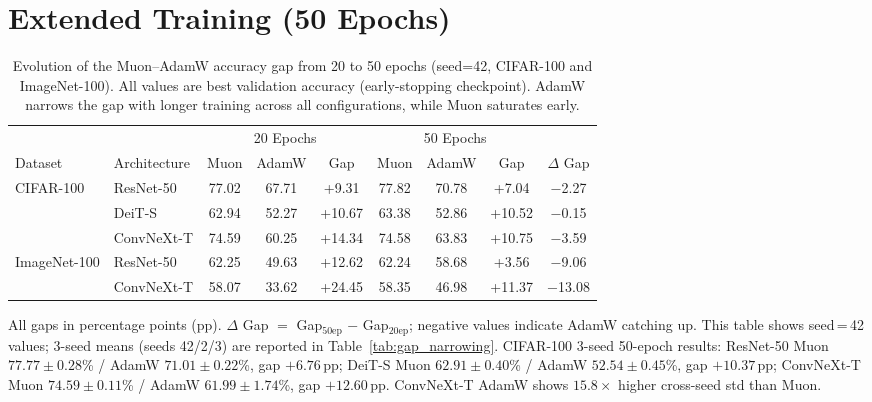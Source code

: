 \section{Extended Training (50 Epochs)}\label{sec:extended_training}

\begin{table}[h]
\centering
\caption{Evolution of the Muon--AdamW accuracy gap from 20 to 50 epochs (seed=42, CIFAR-100 and ImageNet-100). All values are best validation accuracy (early-stopping checkpoint). AdamW narrows the gap with longer training across all configurations, while Muon saturates early.}
\label{tab:gap_evolution}
\small
\begin{tabular}{llccccccc}
\toprule
 & & \multicolumn{3}{c}{20 Epochs} & \multicolumn{3}{c}{50 Epochs} & \\
\cmidrule(lr){3-5} \cmidrule(lr){6-8}
Dataset & Architecture & Muon & AdamW & Gap & Muon & AdamW & Gap & $\Delta$ Gap \\
\midrule
\multirow{3}{*}{CIFAR-100}
 & ResNet-50  & 77.02 & 67.71 & +9.31 & 77.82 & 70.78 & +7.04 & $-$2.27 \\
 & DeiT-S     & 62.94 & 52.27 & +10.67 & 63.38 & 52.86 & +10.52 & $-$0.15 \\
 & ConvNeXt-T & 74.59 & 60.25 & +14.34 & 74.58 & 63.83 & +10.75 & $-$3.59 \\
\midrule
\multirow{2}{*}{ImageNet-100}
 & ResNet-50  & 62.25 & 49.63 & +12.62 & 62.24 & 58.68 & +3.56 & $-$9.06 \\
 & ConvNeXt-T & 58.07 & 33.62 & +24.45 & 58.35 & 46.98 & +11.37 & $-$13.08 \\
\bottomrule
\end{tabular}
\vspace{0.3em}
\par\noindent\footnotesize{All gaps in percentage points (pp). $\Delta$ Gap $=$ Gap$_{50\text{ep}}$ $-$ Gap$_{20\text{ep}}$; negative values indicate AdamW catching up. This table shows seed\,=\,42 values; 3-seed means (seeds 42/2/3) are reported in Table~\ref{tab:gap_narrowing}. CIFAR-100 3-seed 50-epoch results: ResNet-50 Muon $77.77{\pm}0.28$\% / AdamW $71.01{\pm}0.22$\%, gap $+6.76$\,pp; DeiT-S Muon $62.91{\pm}0.40$\% / AdamW $52.54{\pm}0.45$\%, gap $+10.37$\,pp; ConvNeXt-T Muon $74.59{\pm}0.11$\% / AdamW $61.99{\pm}1.74$\%, gap $+12.60$\,pp. ConvNeXt-T AdamW shows $15.8\times$ higher cross-seed std than Muon.}
\end{table}

